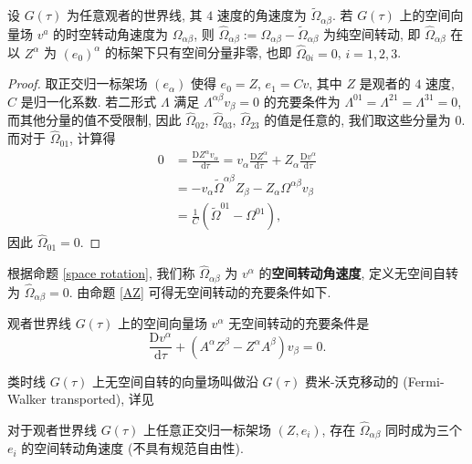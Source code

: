 \begin{proposition}
	\label{space rotation}
	设 $G(\tau)$ 为任意观者的世界线, 其 $4$ 速度的角速度为 $\tilde{\Omega}_{\alpha\beta}$. 若 $G(\tau)$ 上的空间向量场 $v^a$ 的时空转动角速度为 $\Omega_{\alpha\beta}$, 则 $\hat{\Omega}_{\alpha\beta}:=\Omega_{\alpha\beta}-\tilde{\Omega}_{\alpha\beta}$ 为纯空间转动, 即 $\hat{\Omega}_{\alpha\beta}$ 在以 $Z^\alpha$ 为 $(e_0)^\alpha$ 的标架下只有空间分量非零, 也即 $\hat{\Omega}_{0i}=0$, $i=1,2,3$.
\end{proposition}

\begin{proof}
	取正交归一标架场 $(e_\alpha)$ 使得 $e_0=Z$, $e_1=Cv$, 其中 $Z$ 是观者的 $4$ 速度, $C$ 是归一化系数. 若二形式 $\Lambda$ 满足 $\Lambda^{\alpha\beta}v_\beta=0$ 的充要条件为 $\Lambda^{01}=\Lambda^{21}=\Lambda^{31}=0$, 而其他分量的值不受限制, 因此 $\hat{\Omega}_{02}$, $\hat{\Omega}_{03}$, $\hat{\Omega}_{23}$ 的值是任意的, 我们取这些分量为 $0$. 而对于 $\hat{\Omega}_{01}$, 计算得
	\begin{align*}
		0 &= \frac{\mathrm{D}Z^{\alpha}v_{\alpha}}{\mathrm{d}\tau}=v_\alpha\frac{\mathrm{D}Z^{\alpha}}{\mathrm{d}\tau}+Z_{\alpha}\frac{\mathrm{D}v^{\alpha}}{\mathrm{d}\tau}\\
		&=-v_\alpha\tilde{\Omega}^{\alpha\beta}Z_{\beta}-Z_\alpha\Omega^{\alpha\beta}v_{\beta}\\
		&=\frac{1}{C}(\tilde{\Omega}^{01}-\Omega^{01}),
	\end{align*}
	因此 $\hat{\Omega}_{01}=0$.
\end{proof}
根据命题 \ref{space rotation}, 我们称 $\hat{\Omega}_{\alpha\beta}$ 为 $v^\alpha$ 的{\bf 空间转动角速度}, 定义无空间自转为 $\hat{\Omega}_{\alpha\beta}=0$. 由命题 \ref{AZ} 可得无空间转动的充要条件如下.
\begin{proposition}
	观者世界线 $G(\tau)$ 上的空间向量场 $v^\alpha$ 无空间转动的充要条件是
	\[ \frac{\mathrm{D}v^{\alpha}}{\mathrm{d}\tau}+(A^{\alpha}Z^{\beta}-Z^{\alpha}A^{\beta})v_{\beta}=0. \] 
\end{proposition}
\begin{remark}
	类时线 $G(\tau)$ 上无空间自转的向量场叫做沿 $G(\tau)$ 费米-沃克移动的 (Fermi-Walker transported), 详见 \cite[\S\,7.3]{梁灿彬2000微分几何入门与广义相对论} 
\end{remark}
\begin{proposition}
	对于观者世界线 $G(\tau)$ 上任意正交归一标架场 $(Z,e_i)$, 存在 $\hat{\Omega}_{\alpha\beta}$ 同时成为三个 $e_i$ 的空间转动角速度 (不具有规范自由性).
\end{proposition}
